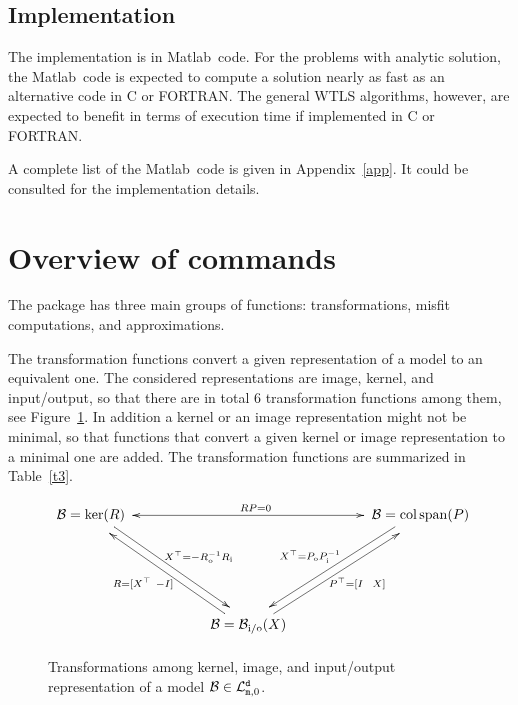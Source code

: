 \documentclass[10pt]{article}
\newcommand{\la}[1]{\label{#1}}
\newcommand{\colspan}{\operatorname{col\,span}}
\newcommand{\B}{\mathcal{B}}    %
\newcommand{\calL}{\mathcal{L}} %
\newcommand{\io}{\text{\rm i/o}}
\newcommand{\tin}{\text{\rm i}}   %
\newcommand{\tout}{\text{\rm o}}  %
\newcommand{\ttm}{{\tt m}} %
\newcommand{\ttd}{{\tt d}} %
\newcommand{\matlab}{{\sc Matlab}}
\theoremstyle{remark}
\begin{document}
\subsection*{Implementation}

The implementation is in \matlab\ code. For the problems with analytic solution, the \matlab\ code is expected to compute a solution nearly as fast as an alternative code in C or FORTRAN. The general WTLS algorithms, however, are expected to benefit in terms of execution time if implemented in C or FORTRAN.

A complete list of the \matlab\ code is given in Appendix~\ref{app}. It could be consulted for the implementation details.

\section{Overview of commands}\la{s2}

The package has three main groups of functions: transformations, misfit computations, and approximations. 

The transformation functions convert a given representation of a model to an equivalent one. The considered representations are image, kernel, and input/output, so that there are in total 6 transformation functions among them, see Figure~\ref{f1}. In addition a kernel or an image representation might not be minimal, so that functions that convert a given kernel or image representation to a minimal one are added. The transformation functions are summarized in Table~\ref{t3}.

\begin{figure}[!ht]
$$
\xymatrix
@C=1.75cm
@R=2cm
@M=2mm
{ 
\B=\ker(R) 
\ar@{<->}[rr]^{RP=0} 
\ar@<1mm>[rd]^{X^{\top}=-R_{\tout}^{-1}R_{\tin}} 
&& 
\B=\colspan(P)
\ar@<-1mm>[ld]_{X^{\top}=P_{\tout}P_{\tin}^{-1}} 
\\ &
\B=\B_\io(X)
\ar@<1mm>[ul]^{R = [ X^{\top} \  -I ] } 
\ar@<-1mm>[ur]_{P^{\top} = [ I \ \ X ] } 
}
$$
\caption{Transformations among kernel, image, and input/output representation of a model $\B\in\calL_{\ttm,0}^\ttd$.} \la{f1}
\end{figure}
\end{document}
